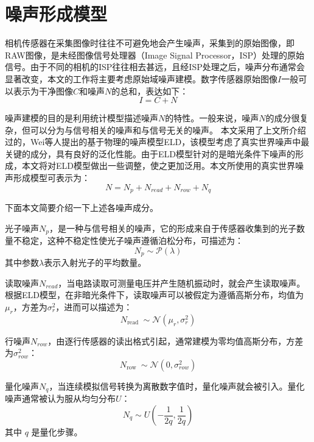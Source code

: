 \section{噪声形成模型}

相机传感器在采集图像时往往不可避免地会产生噪声，采集到的原始图像，即RAW图像，是未经图像信号处理器（Image Signal Processor，ISP）处理的原始信号。由于不同的相机的ISP往往相去甚远，且经ISP处理之后，噪声分布通常会显著改变\cite{noiseflow}，本文的工作将主要考虑原始域噪声建模。数字传感器原始图像$I$一般可以表示为干净图像$C$和噪声$N$的总和，表达如下：
\begin{equation}
	I = C + N
\end{equation}

噪声建模的目的是利用统计模型描述噪声$N$的特性。一般来说，噪声$N$的成分很复杂，但可以分为与信号相关的噪声和与信号无关的噪声。
本文采用了上文所介绍过的，Wei等人提出的基于物理的噪声模型ELD\cite{eld}，该模型考虑了真实世界噪声中最关键的成分，具有良好的泛化性能。由于ELD模型针对的是暗光条件下噪声的形成，本文将对ELD模型做出一些调整，使之更加泛用。本文所使用的真实世界噪声形成模型可表示为：
\begin{equation}
	N=N_p+N_{read }+N_{row }+N_q
	\label{noisemodel}
\end{equation}

下面本文简要介绍一下上述各噪声成分。

光子噪声$N_p$，是一种与信号相关的噪声，它的形成来自于传感器收集到的光子数量不稳定，这种不稳定性使光子噪声遵循泊松分布\cite{photon}，可描述为：
\begin{equation}
	N_p \sim \mathcal{P}(\lambda)
\end{equation}
其中参数$\lambda$表示入射光子的平均数量。

读取噪声$N_{read}$，当电路读取可测量电压并产生随机振动时，就会产生读取噪声。根据ELD模型\cite{eld}，在非暗光条件下，读取噪声可以被假定为遵循高斯分布，均值为$\mu_r$，方差为$\sigma_r^2$，进而可以描述为：
\begin{equation}
	N_{\text {read }} \sim \mathcal{N}\left(\mu_r, \sigma_r^2\right) 
\end{equation}

行噪声$N_{row}$，由逐行传感器的读出格式引起，通常建模为零均值高斯分布，方差为$\sigma_{row}^2$：
\begin{equation}
	N_{\text {row }} \sim \mathcal{N}\left(0, \sigma_{row}^2\right) 
\end{equation}

量化噪声$N_q$，当连续模拟信号转换为离散数字值时，量化噪声就会被引入。量化噪声通常被认为服从均匀分布$U$：
\begin{equation}
	N_q \sim U\left(-\frac{1}{2 q}, \frac{1}{2 q}\right)
\end{equation}
其中 $q$ 是量化步骤。

